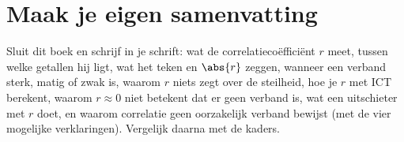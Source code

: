 \ifzelfstudie
\section*{Maak je eigen samenvatting}
Sluit dit boek en schrijf in je schrift: wat de correlatiecoëfficiënt $r$ meet, tussen welke getallen hij ligt, wat het teken en $\abs{r}$ zeggen, wanneer een verband sterk, matig of zwak is, waarom $r$ niets zegt over de steilheid, hoe je $r$ met ICT berekent, waarom $r \approx 0$ niet betekent dat er geen verband is, wat een uitschieter met $r$ doet, en waarom correlatie geen oorzakelijk verband bewijst (met de vier mogelijke verklaringen). Vergelijk daarna met de kaders.
\fi
